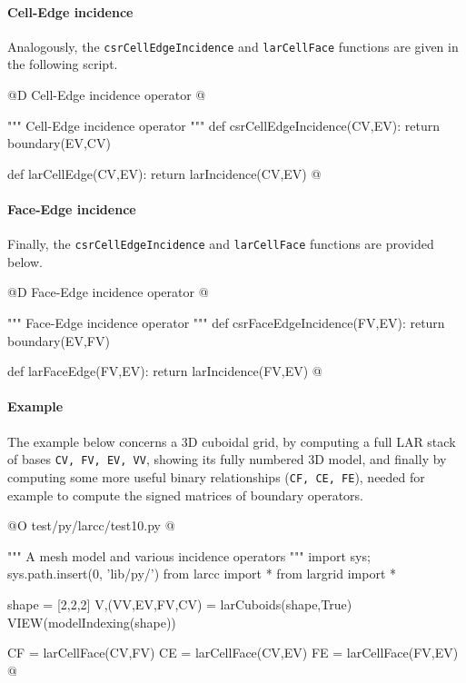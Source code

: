 \documentclass[11pt,oneside]{article}	%
\begin{document}
\paragraph{Cell-Edge incidence}
Analogously, the \texttt{csrCellEdgeIncidence} and \texttt{larCellFace} functions are given in the following script.

@D Cell-Edge incidence operator
@{""" Cell-Edge incidence operator """
def csrCellEdgeIncidence(CV,EV):
	 return boundary(EV,CV)

def larCellEdge(CV,EV):
	return larIncidence(CV,EV)
@}

\paragraph{Face-Edge incidence}
Finally, the \texttt{csrCellEdgeIncidence} and \texttt{larCellFace} functions are provided below.

@D Face-Edge incidence operator
@{""" Face-Edge incidence operator """
def csrFaceEdgeIncidence(FV,EV):
	return boundary(EV,FV)

def larFaceEdge(FV,EV):
	return larIncidence(FV,EV)
@}


\paragraph{Example}
The example below concerns a 3D cuboidal grid, by computing a full LAR stack of bases
\texttt{CV, FV, EV, VV}, showing its fully numbered 3D model, and finally by computing
some more useful binary relationships (\texttt{CF, CE, FE}), needed for example to compute the signed matrices of boundary operators.

@O test/py/larcc/test10.py
@{""" A mesh model and various incidence operators """
import sys; sys.path.insert(0, 'lib/py/')
from larcc import *
from largrid import *

shape = [2,2,2]
V,(VV,EV,FV,CV) = larCuboids(shape,True)
VIEW(modelIndexing(shape))

CF = larCellFace(CV,FV)
CE = larCellFace(CV,EV)
FE = larCellFace(FV,EV)
@}
\end{document}

